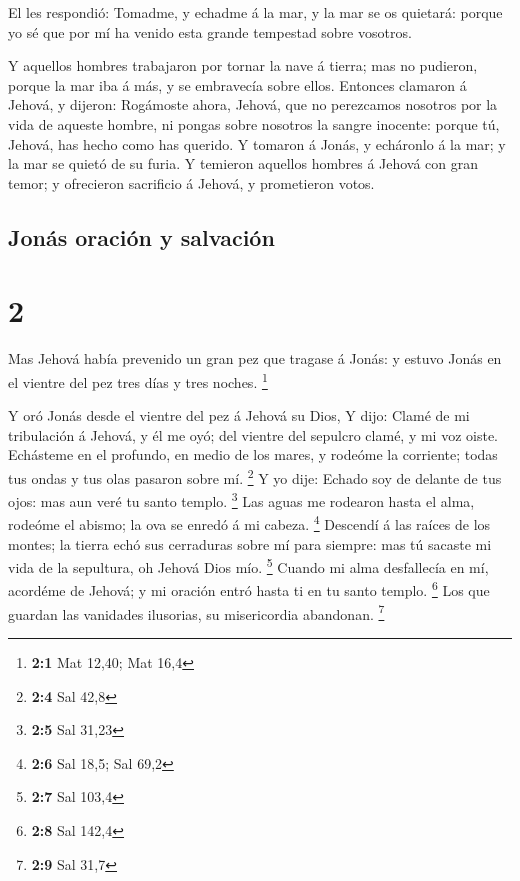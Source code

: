  El les respondió: Tomadme, y echadme á la mar, y la mar
se os quietará: porque yo sé que por mí ha venido esta grande tempestad
sobre vosotros.

 Y aquellos hombres trabajaron por tornar la nave á
tierra; mas no pudieron, porque la mar iba á más, y se embravecía sobre
ellos.  Entonces clamaron á Jehová, y dijeron: Rogámoste
ahora, Jehová, que no perezcamos nosotros por la vida de aqueste hombre,
ni pongas sobre nosotros la sangre inocente: porque tú, Jehová, has
hecho como has querido.  Y tomaron á Jonás, y echáronlo á
la mar; y la mar se quietó de su furia.  Y temieron
aquellos hombres á Jehová con gran temor; y ofrecieron sacrificio á
Jehová, y prometieron votos. 

\hypertarget{jonuxe1s-oraciuxf3n-y-salvaciuxf3n}{%
\subsection{Jonás oración y
salvación}\label{jonuxe1s-oraciuxf3n-y-salvaciuxf3n}}

\hypertarget{section-1}{%
\section{2}\label{section-1}}

 Mas Jehová había prevenido un gran pez que tragase á
Jonás: y estuvo Jonás en el vientre del pez tres días y tres noches.
\footnote{\textbf{2:1} Mat 12,40; Mat 16,4}

 Y oró Jonás desde el vientre del pez á Jehová su Dios,
 Y dijo: Clamé de mi tribulación á Jehová, y él me oyó;
del vientre del sepulcro clamé, y mi voz oiste.  Echásteme
en el profundo, en medio de los mares, y rodeóme la corriente; todas tus
ondas y tus olas pasaron sobre mí. \footnote{\textbf{2:4} Sal 42,8}
 Y yo dije: Echado soy de delante de tus ojos: mas aun
veré tu santo templo. \footnote{\textbf{2:5} Sal 31,23} 
Las aguas me rodearon hasta el alma, rodeóme el abismo; la ova se enredó
á mi cabeza. \footnote{\textbf{2:6} Sal 18,5; Sal 69,2} 
Descendí á las raíces de los montes; la tierra echó sus cerraduras sobre
mí para siempre: mas tú sacaste mi vida de la sepultura, oh Jehová Dios
mío. \footnote{\textbf{2:7} Sal 103,4}  Cuando mi alma
desfallecía en mí, acordéme de Jehová; y mi oración entró hasta ti en tu
santo templo. \footnote{\textbf{2:8} Sal 142,4}  Los que
guardan las vanidades ilusorias, su misericordia abandonan. \footnote{\textbf{2:9}
  Sal 31,7}

